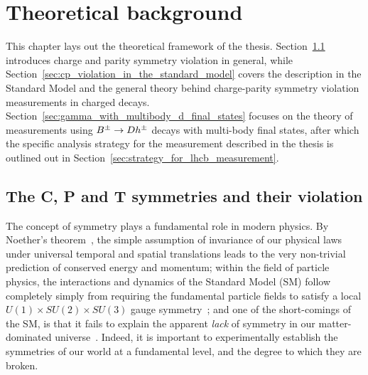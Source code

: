 

\chapter{Theoretical background}
\label{ch:2-litreview}


This chapter lays out the theoretical framework of the thesis. Section~\ref{sec:the_c_and_p_symmetries_and_their_violation} introduces charge and parity symmetry violation in general, while Section~\ref{sec:cp_violation_in_the_standard_model} covers the description in the Standard Model and the general theory behind charge-parity symmetry violation measurements in charged \B decays. Section~\ref{sec:gamma_with_multibody_d_final_states} focuses on the theory of measurements using ${{B}^\pm}\rightarrow{\ensuremath{D}} h^\pm$ decays with multi-body \D final states, after which the specific analysis strategy for the measurement described in the thesis is outlined out in Section~\ref{sec:strategy_for_lhcb_measurement}.


\section{The C, P and T symmetries and their violation} %
\label{sec:the_c_and_p_symmetries_and_their_violation}

The concept of symmetry plays a fundamental role in modern physics. By Noether's theorem~\cite{noetherInvarianteVariationsprobleme1918}, the simple assumption of invariance of our physical laws under universal temporal and spatial translations leads to the very non-trivial prediction of conserved energy and momentum; 
%
within the field of particle physics, the interactions and dynamics of the Standard Model (SM) follow completely simply from requiring the fundamental particle fields to satisfy a local $U(1)\times SU(2)\times SU(3)$ gauge symmetry~\cite{donoghueDynamicsStandardModel2014};  
%
 and one of the short-comings of the SM, is that it fails to explain the apparent \emph{lack} of symmetry in our matter-dominated universe~\cite{sakarovViolationCPInvariance1966}. 
 Indeed, it is important to experimentally establish the symmetries of our world at a fundamental level, and the degree to which they are broken.

